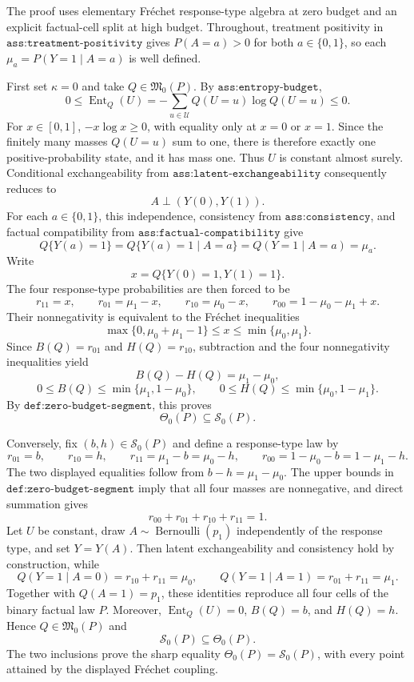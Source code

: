 The proof uses elementary Fr\'echet response-type algebra at zero budget and an explicit factual-cell split at high budget.  Throughout, treatment positivity in \(\texttt{ass:treatment-positivity}\) gives \(P(A=a)>0\) for both \(a\in\{0,1\}\), so each \(\mu_a=P(Y=1\mid A=a)\) is well defined.

First set \(\kappa=0\) and take \(Q\in\mathfrak M_0(P)\).  By \(\texttt{ass:entropy-budget}\),
\[
0\leq \operatorname{Ent}_Q(U)=-\sum_{u\in\mathcal U}Q(U=u)\log Q(U=u)\leq 0.
\]
For \(x\in[0,1]\), \(-x\log x\geq0\), with equality only at \(x=0\) or \(x=1\).  Since the finitely many masses \(Q(U=u)\) sum to one, there is therefore exactly one positive-probability state, and it has mass one.  Thus \(U\) is constant almost surely.  Conditional exchangeability from \(\texttt{ass:latent-exchangeability}\) consequently reduces to
\[
A\perp (Y(0),Y(1)).
\]
For each \(a\in\{0,1\}\), this independence, consistency from \(\texttt{ass:consistency}\), and factual compatibility from \(\texttt{ass:factual-compatibility}\) give
\[
Q\{Y(a)=1\}=Q\{Y(a)=1\mid A=a\}=Q(Y=1\mid A=a)=\mu_a.
\]
Write
\[
x=Q\{Y(0)=1,Y(1)=1\}.
\]
The four response-type probabilities are then forced to be
\[
r_{11}=x,\qquad r_{01}=\mu_1-x,\qquad r_{10}=\mu_0-x,\qquad
r_{00}=1-\mu_0-\mu_1+x.
\]
Their nonnegativity is equivalent to the Fr\'echet inequalities
\[
\max\{0,\mu_0+\mu_1-1\}\leq x\leq\min\{\mu_0,\mu_1\}.
\]
Since \(B(Q)=r_{01}\) and \(H(Q)=r_{10}\), subtraction and the four nonnegativity inequalities yield
\[
B(Q)-H(Q)=\mu_1-\mu_0,
\]
\[
0\leq B(Q)\leq\min\{\mu_1,1-\mu_0\},\qquad
0\leq H(Q)\leq\min\{\mu_0,1-\mu_1\}.
\]
By \(\texttt{def:zero-budget-segment}\), this proves
\[
\Theta_0(P)\subseteq\mathcal S_0(P).
\]

Conversely, fix \((b,h)\in\mathcal S_0(P)\) and define a response-type law by
\[
r_{01}=b,\qquad r_{10}=h,\qquad
r_{11}=\mu_1-b=\mu_0-h,\qquad
r_{00}=1-\mu_0-b=1-\mu_1-h.
\]
The two displayed equalities follow from \(b-h=\mu_1-\mu_0\).  The upper bounds in \(\texttt{def:zero-budget-segment}\) imply that all four masses are nonnegative, and direct summation gives
\[
r_{00}+r_{01}+r_{10}+r_{11}=1.
\]
Let \(U\) be constant, draw \(A\sim\operatorname{Bernoulli}(p_1)\) independently of the response type, and set \(Y=Y(A)\).  Then latent exchangeability and consistency hold by construction, while
\[
Q(Y=1\mid A=0)=r_{10}+r_{11}=\mu_0,
\qquad
Q(Y=1\mid A=1)=r_{01}+r_{11}=\mu_1.
\]
Together with \(Q(A=1)=p_1\), these identities reproduce all four cells of the binary factual law \(P\).  Moreover, \(\operatorname{Ent}_Q(U)=0\), \(B(Q)=b\), and \(H(Q)=h\).  Hence \(Q\in\mathfrak M_0(P)\) and
\[
\mathcal S_0(P)\subseteq\Theta_0(P).
\]
The two inclusions prove the sharp equality \(\Theta_0(P)=\mathcal S_0(P)\), with every point attained by the displayed Fr\'echet coupling.

